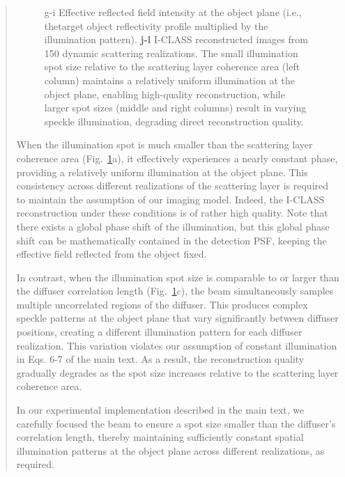 \documentclass[12pt]{article}
\newenvironment{ourresponse}
    {\begin{tcolorbox}[width=\linewidth,breakable,enhanced,colback=gray!5,colframe=responsecolor!50,title=Response,left=5pt,right=5pt]}
    {\end{tcolorbox}}
\begin{document}
\begin{ourresponse}
\begin{quote}
\begin{figure}[H]
{{g-i} Effective reflected field intensity at the object plane (i.e., thetarget object reflectivity profile multiplied by the illumination pattern). \textbf{j-l}  I-CLASS reconstructed images from 150 dynamic scattering realizations. The small illumination spot size relative to the scattering layer coherence area (left column) maintains a relatively uniform illumination at the object plane, enabling high-quality reconstruction, while larger spot sizes (middle and right columns) result in varying speckle illumination, degrading direct reconstruction quality.}
\label{fig_S7_1}
\end{figure}

When the illumination spot is much smaller than the scattering layer coherence area (Fig.~\ref{fig_S7_1}a), it effectively experiences a nearly constant phase, providing a relatively uniform illumination at the object plane. This consistency across different realizations of the scattering layer is required to maintain the assumption of our imaging model. Indeed, the I-CLASS reconstruction under these conditions is of rather high quality.
Note that there exists a global phase shift of the illumination, but this global phase shift can be mathematically contained in the detection PSF, keeping the effective field reflected from the object fixed.

In contrast, when the illumination spot size is comparable to or larger than the diffuser correlation length (Fig.~\ref{fig_S7_1}c), the beam simultaneously samples multiple uncorrelated regions of the diffuser. This produces complex speckle patterns at the object plane that vary significantly between diffuser positions, creating a different illumination pattern for each diffuser realization. This variation violates our assumption of constant illumination in Eqs. 6-7 of the main text. As a result, the reconstruction quality gradually degrades as the spot size increases relative to the scattering layer coherence area. 

In our experimental implementation described in the main text, we carefully focused the beam to ensure a spot size smaller than the diffuser's correlation length, thereby maintaining sufficiently constant spatial illumination patterns at the object plane across different realizations, as required.
\end{quote}


\end{ourresponse}
\end{document}
